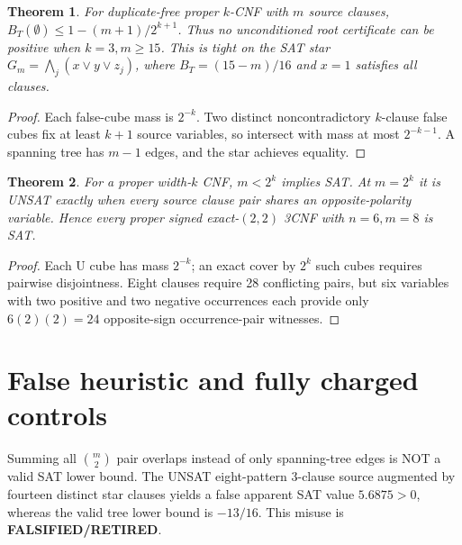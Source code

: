 \documentclass{article}
\newtheorem{theorem}{Theorem}
\begin{document}
\begin{theorem}
For duplicate-free proper $k$-CNF with $m$ source clauses,
$B_T(\emptyset)\le 1-(m+1)/2^{k+1}$.
Thus no unconditioned root certificate can be positive when $k=3,m\ge15$. This is tight on the SAT star $G_m=\bigwedge_j(x\vee y\vee z_j)$, where $B_T=(15-m)/16$ and $x=1$ satisfies all clauses.
\end{theorem}
\begin{proof}
Each false-cube mass is $2^{-k}$. Two distinct noncontradictory $k$-clause false cubes fix at least $k+1$ source variables, so intersect with mass at most $2^{-k-1}$. A spanning tree has $m-1$ edges, and the star achieves equality.
\end{proof}

\begin{theorem}
For a proper width-$k$ CNF, $m<2^k$ implies SAT. At $m=2^k$ it is UNSAT exactly when every source clause pair shares an opposite-polarity variable. Hence every proper signed exact-$(2,2)$ 3CNF with $n=6,m=8$ is SAT.
\end{theorem}
\begin{proof}
Each U cube has mass $2^{-k}$; an exact cover by $2^k$ such cubes requires pairwise disjointness. Eight clauses require 28 conflicting pairs, but six variables with two positive and two negative occurrences each provide only $6(2)(2)=24$ opposite-sign occurrence-pair witnesses.
\end{proof}

\section{False heuristic and fully charged controls}
Summing all $\binom m2$ pair overlaps instead of only spanning-tree edges is NOT a valid SAT lower bound. The UNSAT eight-pattern 3-clause source augmented by fourteen distinct star clauses yields a false apparent SAT value $5.6875>0$, whereas the valid tree lower bound is $-13/16$. This misuse is \textbf{FALSIFIED/RETIRED}.
\end{document}
